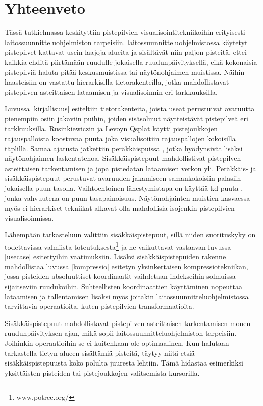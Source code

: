 \section{Yhteenveto}

Tässä tutkielmassa keskityttiin pistepilvien visualisointitekniikoihin erityisesti laitossuunnitteluohjelmiston tarpeisiin. laitossuunnitteluohjelmistossa käytetyt pistepilvet kattavat usein laajoja alueita ja sisältävät niin paljon pisteitä, ettei kaikkia ehditä piirtämään ruudulle jokaisella ruudunpäivityksellä, eikä kokonaisia pistepilviä haluta pitää keskusmuistissa tai näytönohjaimen muistissa. Näihin haasteisiin on vastattu hierarkisilla tietorakenteilla, jotka mahdollistavat pistepilven asteittaisen lataamisen ja visualisoinnin eri tarkkuuksilla. 

Luvussa \ref{kirjallisuus} esiteltiin tietorakenteita, joista useat perustuivat avaruutta pienempiin osiin jakaviin puihin, joiden sisäsolmut näytteistävät pistepilveä eri tarkkuuksilla. Rusinkiewiczin ja Levoyn Qsplat \cite{qsplat} käytti pistejoukkojen rajauspalloista koostuvaa puuta joka visualisoitiin rajauspallojen kokoisilla täplillä. Samaa ajatusta jatkettiin peräkkäispuissa \cite{spt}\cite{ip}, jotka hyödynsivät lisäksi näytönohjaimen laskentatehoa. Sisäkkäispistepuut \cite{scheiblauer}\cite{potree} mahdollistivat pistepilven asteittaisen tarkentamisen ja jopa pistedatan lataamisen verkon yli. Peräkkäis- ja sisäkkäispistepuut perustuvat avaruuden jakamiseen samankokoisiin palasiin jokaisella puun tasolla. Vaihtoehtoinen lähestymistapa on käyttää kd-puuta \cite{richter}\cite{smooth}, jonka vahvuutena on puun tasapainoisuus. Näytönohjainten muistien kasvaessa myös ei-hierarkiset tekniikat \cite{clod}\cite{progressive} alkavat olla mahdollisia isojenkin pistepilvien visualisoinnissa. 

Lähempään tarkasteluun valittiin sisäkkäispistepuut, sillä niiden suorituskyky on todettavissa valmiista toteutuksesta\footnote{www.potree.org/} ja ne vaikuttavat vastaavan luvussa \ref{usecase} esitettyihin vaatimuksiin. Lisäksi sisäkkäispistepuiden rakenne mahdollistaa luvussa \ref{kompressio} esitetyn yksinkertaisen kompressiotekniikan, jossa pisteiden absoluuttiset koordinaatit vaihdetaan indekseihin solmuissa sijaitseviin ruudukoihin. Suhteellisten koordinaattien käyttäminen nopeuttaa lataamisen ja tallentamisen lisäksi myös joitakin laitossuunnitteluohjelmistossa tarvittavia operaatioita, kuten pistepilvien transformaatioita. 

Sisäkkäispistepuut mahdollistavat pistepilven asteittaisen tarkentamisen monen ruudunpäivityksen ajan, mikä sopii laitossuunnitteluohjelmiston tarpeisiin. Joihinkin operaatioihin se ei kuitenkaan ole optimaalinen. Kun halutaan tarkastella tietyn alueen sisältämiä pisteitä, täytyy niitä etsiä sisäkkäispistepuusta koko polulta juuresta lehtiin. Tämä hidastaa esimerkiksi yksittäisten pisteiden tai pistejoukkojen valitsemista kursorilla.

